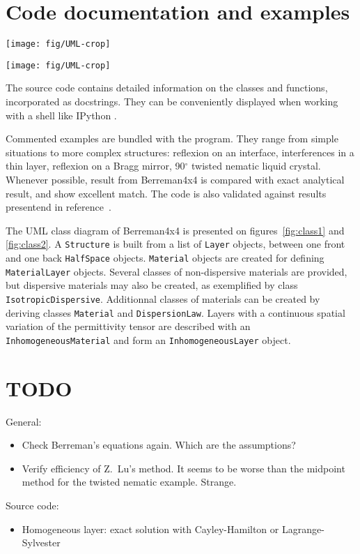 \section{Code documentation and examples}

\begin{figure*}
\texttt{[image: fig/UML-crop]}
\caption{\label{fig:class1}Class diagram of Berreman4x4: structure, materials, and module functions. }
\end{figure*}

\begin{figure*}
\texttt{[image: fig/UML-crop]}
\caption{\label{fig:class2}Class diagram of Berreman4x4: layers, inhomogeneous materials, and half-spaces.}
\end{figure*}

The source code contains detailed information on the classes and functions, incorporated as docstrings.
They can be conveniently displayed when working with a shell like IPython \cite{IPython}.

Commented examples are bundled with the program.
They range from simple situations to more complex structures: reflexion on an interface, interferences in a thin layer, reflexion on a Bragg mirror, 90$^\circ$ twisted nematic liquid crystal.
Whenever possible, result from Berreman4x4 is compared with exact analytical result, and show excellent match.
The code is also validated against results presentend in reference~.

The UML class diagram of Berreman4x4 is presented on figures~\ref{fig:class1} and \ref{fig:class2}.
A \texttt{Structure} is built from a list of \texttt{Layer} objects, between one front and one back \texttt{HalfSpace} objects.
\texttt{Material} objects are created for defining \texttt{MaterialLayer} objects.
Several classes of non-dispersive materials are provided, but dispersive materials may also be created, as exemplified by class \texttt{IsotropicDispersive}.
Additionnal classes of materials can be created by deriving classes \texttt{Material} and \texttt{DispersionLaw}.
Layers with a continuous spatial variation of the permittivity tensor are described with an \texttt{InhomogeneousMaterial} and form an \texttt{InhomogeneousLayer} object.

\section{TODO}

General:
\begin{itemize}
\item Check Berreman's equations again. Which are the assumptions?
\item Verify efficiency of Z.~Lu's method. It seems to be worse than the midpoint method for the twisted nematic example. Strange.
\end{itemize}
%
Source code:
\begin{itemize}
\item Homogeneous layer: exact solution with Cayley-Hamilton or Lagrange-Sylvester
\end{itemize}


